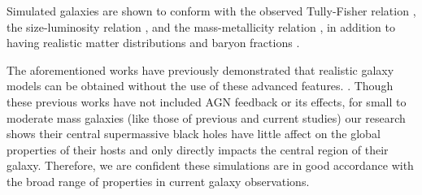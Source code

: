 \documentclass[manuscript]{aastex}
\begin{document}
Simulated galaxies are shown to conform with the observed Tully-Fisher relation \citep{Governato2009}, the size-luminosity relation \citep{Brooks2011}, and the mass-metallicity relation \citep{Brooks2007}, in addition to having realistic matter distributions and baryon fractions \citep{Governato2009a,Guedes2011}.

 The aforementioned works have previously demonstrated that realistic galaxy models can be obtained without the use of these advanced features. \citep{Christensen2012}. Though these previous works have not included AGN feedback or its effects, for small to moderate mass galaxies (like those of previous and current studies) our research shows their central supermassive black holes have little affect on the global properties of their hosts and only directly impacts the central region of their galaxy. Therefore, we are confident these simulations are in good accordance with the broad range of properties in current galaxy observations.
 
\end{document}

